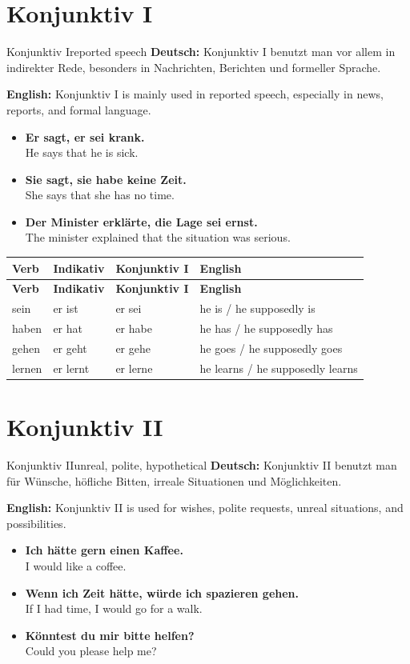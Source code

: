 \documentclass[a4paper,11pt]{article}
\newcommand{\GermanText}[1]{\textbf{Deutsch: }#1\par}
\newcommand{\EnglishText}[1]{{\small\color{SoftGray}\textbf{English: }#1\par}}
\newcommand{\ExampleItem}[2]{\item \textbf{#1}\\{\small\color{SoftGray}#2}}
\begin{document}
\section{Konjunktiv I}

\begin{grammarentry}{Konjunktiv I}{reported speech}
\GermanText{Konjunktiv I benutzt man vor allem in indirekter Rede, besonders in Nachrichten, Berichten und formeller Sprache.}
\EnglishText{Konjunktiv I is mainly used in reported speech, especially in news, reports, and formal language.}

\begin{exbox}
\begin{itemize}
    \ExampleItem{Er sagt, er sei krank.}{He says that he is sick.}
    \ExampleItem{Sie sagt, sie habe keine Zeit.}{She says that she has no time.}
    \ExampleItem{Der Minister erklärte, die Lage sei ernst.}{The minister explained that the situation was serious.}
\end{itemize}
\end{exbox}
\end{grammarentry}

\begin{longtable}{L{3cm}L{4cm}L{4cm}L{4cm}}
\color{white}\textbf{Verb} & \color{white}\textbf{Indikativ} & \color{white}\textbf{Konjunktiv I} & \color{white}\textbf{English} \\
\endfirsthead
{}
\color{white}\textbf{Verb} & \color{white}\textbf{Indikativ} & \color{white}\textbf{Konjunktiv I} & \color{white}\textbf{English} \\
\endhead
sein & er ist & er sei & he is / he supposedly is \\
haben & er hat & er habe & he has / he supposedly has \\
gehen & er geht & er gehe & he goes / he supposedly goes \\
lernen & er lernt & er lerne & he learns / he supposedly learns \\
\end{longtable}

\section{Konjunktiv II}

\begin{grammarentry}{Konjunktiv II}{unreal, polite, hypothetical}
\GermanText{Konjunktiv II benutzt man für Wünsche, höfliche Bitten, irreale Situationen und Möglichkeiten.}
\EnglishText{Konjunktiv II is used for wishes, polite requests, unreal situations, and possibilities.}

\begin{exbox}
\begin{itemize}
    \ExampleItem{Ich hätte gern einen Kaffee.}{I would like a coffee.}
    \ExampleItem{Wenn ich Zeit hätte, würde ich spazieren gehen.}{If I had time, I would go for a walk.}
    \ExampleItem{Könntest du mir bitte helfen?}{Could you please help me?}
\end{itemize}
\end{exbox}
\end{grammarentry}
\end{document}
